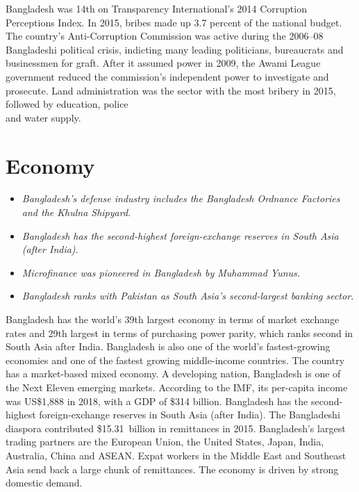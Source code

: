 Bangladesh was 14th on Transparency International's 2014 Corruption
Perceptions Index. In 2015, bribes made up 3.7 percent of the national
budget. The country's Anti-Corruption Commission was active during the
2006--08 Bangladeshi political crisis, indicting many leading
politicians, bureaucrats and businessmen for graft. After it assumed
power in 2009, the Awami League government reduced the commission's
independent power to investigate and prosecute. Land administration was
the sector with the most bribery in 2015, followed by education,
police\\
and water supply.

\section{Economy}\label{economy}

\begin{itemize}
\item
  \emph{Bangladesh's defense industry includes the Bangladesh Ordnance
  Factories and the Khulna Shipyard.}
\item
  \emph{Bangladesh has the second-highest foreign-exchange reserves in
  South Asia (after India).}
\item
  \emph{Microfinance was pioneered in Bangladesh by Muhammad Yunus.}
\item
  \emph{Bangladesh ranks with Pakistan as South Asia's second-largest
  banking sector.}
\end{itemize}

Bangladesh has the world's 39th largest economy in terms of market
exchange rates and 29th largest in terms of purchasing power parity,
which ranks second in South Asia after India. Bangladesh is also one of
the world's fastest-growing economies and one of the fastest growing
middle-income countries. The country has a market-based mixed economy. A
developing nation, Bangladesh is one of the Next Eleven emerging
markets. According to the IMF, its per-capita income was US\$1,888 in
2018, with a GDP of \$314 billion. Bangladesh has the second-highest
foreign-exchange reserves in South Asia (after India). The Bangladeshi
diaspora contributed \$15.31~billion in remittances in 2015.
Bangladesh's largest trading partners are the European Union, the United
States, Japan, India, Australia, China and ASEAN. Expat workers in the
Middle East and Southeast Asia send back a large chunk of remittances.
The economy is driven by strong domestic demand.

